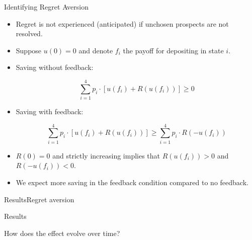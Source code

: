 \documentclass[aspectratio=169]{beamer}
\begin{document}
\begin{frame}{Identifying Regret Aversion}

	\begin{itemize}

		\item Regret is not experienced (anticipated) if unchosen prospects are not resolved.

		\item Suppose $u(0) = 0$ and denote $f_i$ the payoff for depositing in state $i$. 
	
		\item Saving without feedback:

		\[ \sum_{i=1}^4 p_i \cdot [u(f_i) + R(u(f_i))] \geq 0 \]

		\item Saving with feedback:	

		\[\sum_{i=1}^4 p_i \cdot [u(f_i) + R(u(f_i))] \geq \sum_{i=1}^4 p_i \cdot R(-u(f_i)) \]

		\item $R(0) = 0$ and strictly increasing implies that $R(u(f_i)) > 0$ and $R(-u(f_i)) < 0$.

		\item We expect more saving in the feedback condition compared to no feedback.

	\end{itemize}

	
\end{frame}

\begin{frame}{Results}{Regret aversion}

	

\end{frame}

\begin{frame}{Results}
	
	\centering \large How does the effect evolve over time?

\end{frame}
\end{document}
